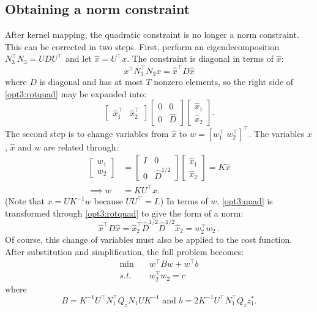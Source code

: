 \documentclass[journal,twoside]{IEEEtran}
\begin{document}
\subsection{Obtaining a norm constraint}\label{sec:solution-norm}
After kernel mapping, the quadratic constraint is no longer a norm
constraint. This can be corrected in two steps. First, perform an
eigendecomposition $N_3^\top N_3 = UDU^\top$ and let $\hat{x} = U^\top
x$. The constraint is diagonal in terms of $\hat{x}$:
\begin{equation}
\label{opt3:rotquad} x^\top N_3^\top N_3 x = \hat{x}^\top D\hat{x}
\end{equation}
where $D$ is diagonal and has at most $T$ nonzero elements, so the
right side of \eqref{opt3:rotquad} may be expanded into:
\begin{equation}
\begin{bmatrix}
\hat{x}_1^\top & \hat{x}_2^\top \end{bmatrix}
\begin{bmatrix} 0 & 0 \\ 0 & \hat{D} \end{bmatrix}
\begin{bmatrix}
\hat{x}_1 \\ \hat{x}_2
\end{bmatrix}.
\end{equation}
The second step is to change variables from $\hat{x}$ to $w =
[w_1^\top \; w_2^\top]^\top$. The variables $x$, $\hat{x}$ and $w$ are
related through:
\begin{align}
\label{eq:x_to_w} \begin{bmatrix} w_1 \\ w_2 \end{bmatrix} &=
\begin{bmatrix} I & 0 \\ 0 & \hat{D}^{1/2} \end{bmatrix}
\begin{bmatrix} \hat{x}_1 \\ \hat{x}_2 \end{bmatrix} = K\hat{x} \\
\nonumber \implies w &= KU^\top x.
\end{align}
(Note that $x = UK^{-1}w$ because $UU^\top = I$.) In terms of $w$,
\eqref{opt3:quad} is transformed through \eqref{opt3:rotquad} to give
the form of a norm:
\begin{equation}
\hat{x}^\top D\hat{x} = \hat{x}_2^\top \hat{D}^{1/2}\hat{D}^{1/2}\hat{x}_2
= w_2^\top w_2~.
\end{equation}
Of course, this change of variables must also be applied to the cost function. After substitution and simplification, the full problem becomes:
\begin{subequations}\label{opt4}
\begin{align}
\label{opt4:obj} \min\quad &w^\top Bw + w^\top b \\
\label{opt4:quad} s.t.\quad &w_2^\top w_2 = c
\end{align}
\end{subequations}
where
\[
B= K^{-1}U^\top N_1^\top Q_z N_1 UK^{-1} \text{ and }b=2 K^{-1}U^\top
N_1^\top Q_z z_1^*.
\]
\end{document}
